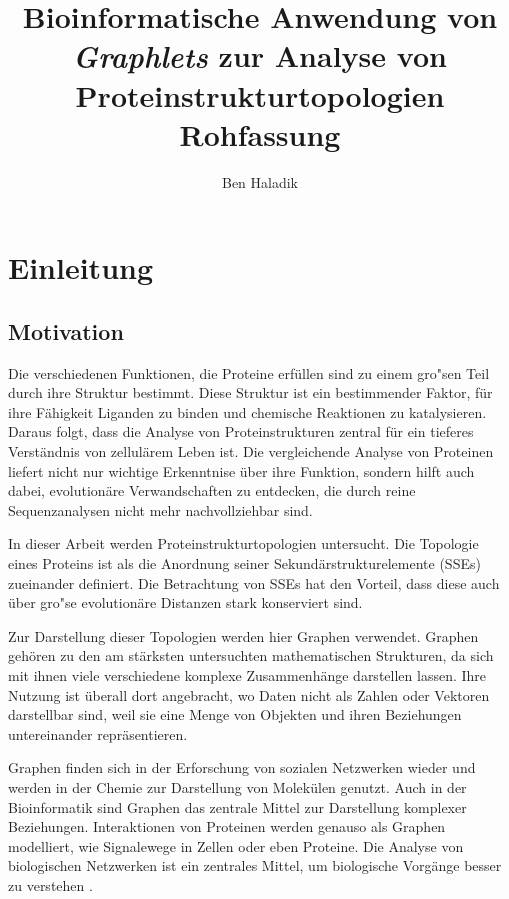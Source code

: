 \documentclass{report}
\author{Ben Haladik}
\title{Bioinformatische Anwendung von \textit{Graphlets} zur Analyse von Proteinstrukturtopologien \\ Rohfassung}
\begin{document}


\maketitle

\newpage

\tableofcontents

\newpage

\chapter{Einleitung}

\section{Motivation}


Die verschiedenen Funktionen, die Proteine erf\"ullen sind zu einem gro"sen Teil durch ihre Struktur bestimmt. Diese Struktur ist ein bestimmender Faktor, f\"ur ihre F\"ahigkeit Liganden zu binden und chemische Reaktionen zu katalysieren.
Daraus folgt, dass die Analyse von Proteinstrukturen zentral f\"ur ein tieferes Verst\"andnis von zellul\"arem Leben ist. Die vergleichende Analyse von Proteinen liefert nicht nur wichtige Erkenntnise \"uber ihre Funktion, sondern hilft auch dabei, evolution\"are Verwandschaften zu entdecken, die durch reine Sequenzanalysen nicht mehr nachvollziehbar sind.

In dieser Arbeit werden Proteinstrukturtopologien untersucht. Die Topologie eines Proteins ist als die Anordnung seiner Sekund\"arstrukturelemente (SSEs) zueinander definiert. Die Betrachtung von SSEs hat den Vorteil, dass diese auch \"uber gro"se evolution\"are Distanzen stark konserviert sind. 

Zur Darstellung dieser Topologien werden hier Graphen verwendet. Graphen geh\"oren zu den am st\"arksten untersuchten mathematischen Strukturen, da sich mit ihnen viele verschiedene komplexe Zusammenh\"ange darstellen lassen. Ihre Nutzung ist \"uberall dort angebracht, wo Daten nicht als Zahlen oder Vektoren darstellbar sind, weil sie eine Menge von Objekten und ihren Beziehungen untereinander repr\"asentieren.


Graphen finden sich in der Erforschung von sozialen Netzwerken wieder und werden in der Chemie zur Darstellung von Molek\"ulen genutzt. Auch in der Bioinformatik sind Graphen das zentrale Mittel zur Darstellung komplexer Beziehungen. Interaktionen von Proteinen werden genauso als Graphen modelliert, wie Signalewege in Zellen oder eben Proteine. Die Analyse von biologischen Netzwerken ist ein zentrales Mittel, um biologische Vorg\"ange besser zu verstehen \cite{junker2011analysis}.
\end{document}
